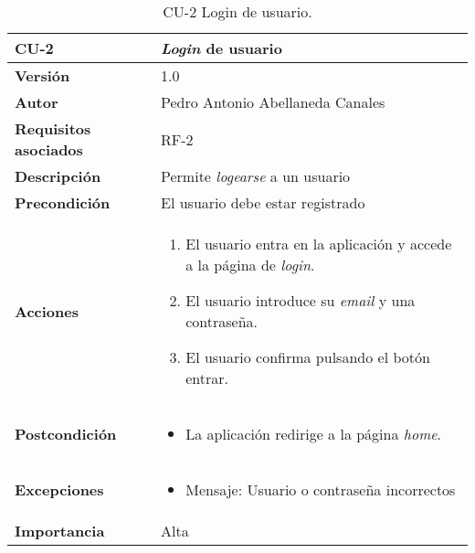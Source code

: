\begin{table}[p]
	\centering
	\begin{tabularx}{\linewidth}{ p{} p{} }
		\toprule
		\textbf{CU-2}    & \textbf{\textit{Login} de usuario} \\
		\midrule
		\textbf{Versión}              & 1.0    \\
		\textbf{Autor}                & Pedro Antonio Abellaneda Canales \\
		\textbf{Requisitos asociados} & RF-2 \\
		\textbf{Descripción}          & Permite \textit{logearse} a un usuario \\
		\textbf{Precondición}         & El usuario debe estar registrado \\
		\textbf{Acciones}             &
		\begin{enumerate}
			\def\labelenumi{\arabic{enumi}.}
			\tightlist
			\item El usuario entra en la aplicación y accede a la página de \textit{login}.
			\item El usuario introduce su \textit{email} y una contraseña.
			\item El usuario confirma pulsando el botón entrar.
		\end{enumerate} \\
		\textbf{Postcondición}        & \begin{itemize}
                                        \tightlist
		                                \item La aplicación redirige a la página \textit{home}.
		                              \end{itemize}  \\
        
		\textbf{Excepciones}          & \begin{itemize}
                                        \tightlist
		                                \item Mensaje: Usuario o contraseña incorrectos
		                              \end{itemize}  \\
		\textbf{Importancia}          & Alta \\
		\bottomrule
	\end{tabularx}
	\caption{CU-2 Login de usuario.}
	\label{tab:CU-2}
\end{table}

